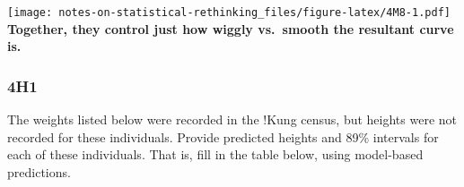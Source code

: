 \documentclass[
]{book}
\newenvironment{Shaded}{\begin{snugshade}}{\end{snugshade}}
\newcommand{\DataTypeTok}[1]{\textcolor[rgb]{0.13,0.29,0.53}{#1}}
\newcommand{\DecValTok}[1]{\textcolor[rgb]{0.00,0.00,0.81}{#1}}
\newcommand{\FloatTok}[1]{\textcolor[rgb]{0.00,0.00,0.81}{#1}}
\newcommand{\KeywordTok}[1]{\textcolor[rgb]{0.13,0.29,0.53}{\textbf{#1}}}
\newcommand{\NormalTok}[1]{#1}
\newcommand{\OperatorTok}[1]{\textcolor[rgb]{0.81,0.36,0.00}{\textbf{#1}}}
\newcommand{\StringTok}[1]{\textcolor[rgb]{0.31,0.60,0.02}{#1}}
\begin{document}
\begin{Shaded}
\end{Shaded}

\texttt{[image: notes-on-statistical-rethinking\_files/figure-latex/4M8-1.pdf]}
\textbf{Together, they control just how wiggly vs.~smooth the resultant curve is.}

\hypertarget{h1-2}{%
\subsubsection*{4H1}\label{h1-2}}

The weights listed below were recorded in the !Kung census, but heights were not recorded for these individuals. Provide predicted heights and 89\% intervals for each of these individuals. That is, fill in the table below, using model-based predictions.
\end{document}
